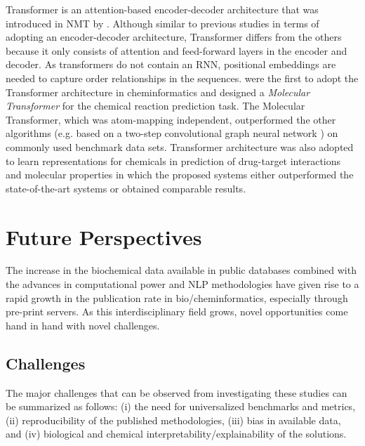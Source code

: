 \documentclass[review]{elsarticle}
\begin{document}
Transformer is an attention-based encoder-decoder architecture that was introduced in NMT by \citet{Vaswani:2017ul}. Although similar to previous studies \cite{sutskever2014sequence, cho2014learning,  bahdanau2014neural} in terms of adopting an encoder-decoder architecture, Transformer differs from the others because it only consists of attention and feed-forward layers in the encoder and decoder.  As transformers do not contain an RNN,  positional embeddings are needed to capture order relationships in the sequences. \citet{schwaller2018molecular} were the first to adopt the Transformer architecture in cheminformatics and designed a \textit{Molecular Transformer} for the chemical reaction prediction task. The Molecular Transformer, which was atom-mapping independent, outperformed the other algorithms (e.g. based on a two-step convolutional graph neural network \cite{coley2019graph}) on commonly used benchmark data sets. Transformer architecture was also adopted to learn representations for chemicals in prediction of drug-target interactions \cite{shin2019self} and molecular properties \cite{wang2019smiles} in which the proposed systems either outperformed the state-of-the-art systems or obtained comparable results. 


\section{Future Perspectives}
The increase in the biochemical data available in  public databases combined with the advances in computational power and NLP methodologies have given rise to a rapid growth in the publication rate in bio/cheminformatics, especially through pre-print servers. As this interdisciplinary field grows, novel opportunities come hand in hand with novel challenges. 

\subsection{Challenges}
The major challenges that can be observed from investigating these studies can be summarized as follows: (i) the need for universalized benchmarks and metrics, (ii) reproducibility of the published methodologies, (iii) bias in available data, and (iv) biological and chemical interpretability/explainability of the solutions. 
\end{document}
